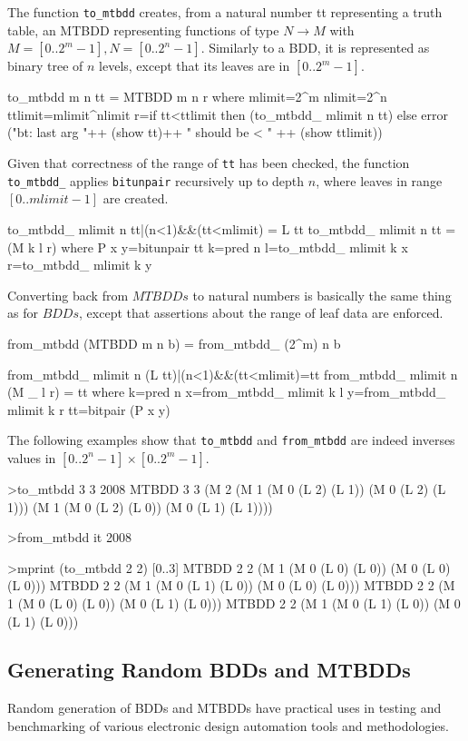 \documentclass[]{INCLUDES/llncs}
\begin{document}
The function  {\tt to\_mtbdd} creates,
from a natural number tt representing a truth table,
an MTBDD representing
functions of type $N \rightarrow M$ with $M=[0..2^m-1], N=[0..2^n-1]$.
Similarly to a BDD, it is represented as binary tree 
of $n$ levels, except that its leaves are in $[0..{2^m}-1]$.
\begin{code}
to_mtbdd m n tt = MTBDD m n r where 
  mlimit=2^m
  nlimit=2^n
  ttlimit=mlimit^nlimit
  r=if tt<ttlimit 
    then (to_mtbdd_ mlimit n tt)
    else error 
      ("bt: last arg "++ (show tt)++
      " should be < " ++ (show ttlimit))
\end{code}
Given that correctness of the range of
{\tt tt} has been checked, the function {\tt to\_mtbdd\_} 
applies {\tt bitunpair} 
recursively up to depth $n$, where
leaves in range $[0..mlimit-1]$ are created.
\begin{code}  
to_mtbdd_ mlimit n tt|(n<1)&&(tt<mlimit) = L tt
to_mtbdd_ mlimit n tt = (M k l r) where 
   P x y=bitunpair tt
   k=pred n
   l=to_mtbdd_ mlimit k x
   r=to_mtbdd_ mlimit k y
\end{code}
Converting back from $MTBDDs$ to natural numbers is
basically the same thing as for $BDDs$, except that
assertions about the range of leaf data are enforced.
\begin{code}
from_mtbdd (MTBDD m n b) = from_mtbdd_ (2^m) n b

from_mtbdd_ mlimit n (L tt)|(n<1)&&(tt<mlimit)=tt
from_mtbdd_ mlimit n (M _ l r) = tt where 
   k=pred n
   x=from_mtbdd_ mlimit k l
   y=from_mtbdd_ mlimit k r
   tt=bitpair (P x y)
\end{code}
The following examples show that {\tt to\_mtbdd} and {\tt from\_mtbdd}
are indeed inverses values in $[0..2^n-1] \times [0..2^m-1]$. 
\begin{codex}
>to_mtbdd 3 3 2008
  MTBDD 3 3 
    (M 2 
      (M 1 
         (M 0 (L 2) (L 1)) 
         (M 0 (L 2) (L 1))) 
      (M 1 
         (M 0 (L 2) (L 0)) 
         (M 0 (L 1) (L 1))))

>from_mtbdd it
2008

>mprint (to_mtbdd 2 2) [0..3]
  MTBDD 2 2 
    (M 1 (M 0 (L 0) (L 0)) (M 0 (L 0) (L 0)))
  MTBDD 2 2 
    (M 1 (M 0 (L 1) (L 0)) (M 0 (L 0) (L 0)))
  MTBDD 2 2 
    (M 1 (M 0 (L 0) (L 0)) (M 0 (L 1) (L 0)))
  MTBDD 2 2 
    (M 1 (M 0 (L 1) (L 0)) (M 0 (L 1) (L 0)))
\end{codex}

\subsection{Generating Random BDDs and MTBDDs}
Random generation of BDDs and MTBDDs have practical uses
in testing and benchmarking of various electronic design
automation tools and methodologies.
\end{document}
